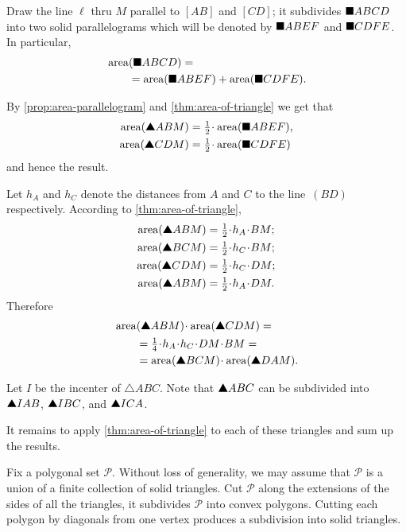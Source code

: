 \begin{multicols}{2}
Draw the line $\ell$ 
thru $M$ parallel to $[AB]$ and $[CD]$;
it subdivides $\blacksquare ABCD$ into two solid parallelograms
which will be denoted by
$\blacksquare ABEF$ and
$\blacksquare CDFE$.
In particular,
\begin{align*}
&\mathop{\rm area}\nolimits(\blacksquare ABCD)=
\\
&\qquad=
\mathop{\rm area}\nolimits(\blacksquare ABEF)+\mathop{\rm area}\nolimits(\blacksquare CDFE).
\end{align*}

By \ref{prop:area-parallelogram} and \ref{thm:area-of-triangle} we get that 
\begin{align*}
\area(\solidtriangle ABM)&=\tfrac12\cdot\area(\solidsquare ABEF),
\\
\area(\solidtriangle CDM)&=\tfrac12\cdot\area(\solidsquare CDFE)
\end{align*}
and hence the result.

Let $h_A$ and $h_C$ denote the distances from $A$ and $C$ to the line~$(BD)$ respectively.
According to \ref{thm:area-of-triangle},
\begin{align*}
\area(\solidtriangle ABM)&=\tfrac12\cdot h_A\cdot BM;
\\
\area(\solidtriangle BCM)&=\tfrac12\cdot h_C\cdot BM;
\\
\area(\solidtriangle CDM)&=\tfrac12\cdot h_C\cdot DM;
\\
\area(\solidtriangle ABM)&=\tfrac12\cdot h_A\cdot DM.
\end{align*}
Therefore
\begin{align*}
&\area(\solidtriangle ABM)\cdot \area(\solidtriangle CDM)=
\\
&\qquad=\tfrac14 \cdot h_A\cdot h_C\cdot DM\cdot BM=
\\
&\qquad=\area(\solidtriangle BCM)\cdot \area(\solidtriangle DAM).
\end{align*}

Let $I$ be the incenter of $\triangle ABC$.
Note that $\solidtriangle ABC$
can be subdivided into 
$\solidtriangle IAB$, 
$\solidtriangle IBC$,
and $\solidtriangle ICA$.

It remains to apply \ref{thm:area-of-triangle} 
to each of these triangles and sum up the results.

 Fix a polygonal set $\mathcal{P}$.
Without loss of generality, we may assume that $\mathcal{P}$ is a union of a finite collection of solid triangles.
Cut $\mathcal{P}$ along the extensions of the sides of all the triangles,
it subdivides $\mathcal{P}$ into convex polygons.
Cutting each polygon by diagonals from one vertex produces a subdivision into solid triangles.


\end{multicols}
